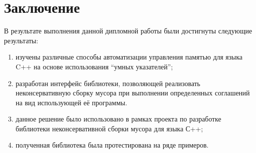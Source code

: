 \section{Заключение}

В результате выполнения данной дипломной работы были достигнуты следующие результаты:

\begin{enumerate}
\item изучены различные способы автоматизации управления памятью для языка C++ на 
основе использования ``умных указателей'';

\item разработан интерфейс библиотеки, позволяющей реализовать неконсервативную сборку мусора
при выполнении определенных соглашений на вид использующей её программы.

\item данное решение было использовано в рамках проекта по разработке библиотеки неконсервативной 
сборки мусора для языка С++;

\item полученная библиотека была протестирована на ряде примеров.
\end{enumerate}
